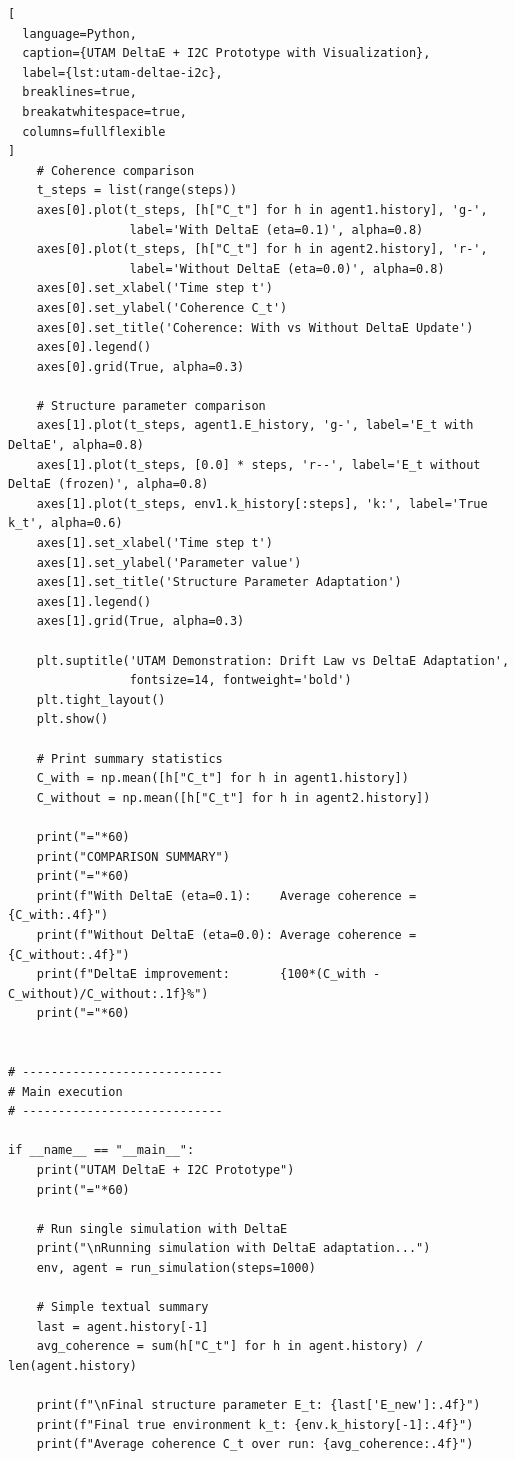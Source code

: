 \documentclass[12pt,a4paper]{report}
\begin{document}
\begin{lstlisting}[
  language=Python,
  caption={UTAM DeltaE + I2C Prototype with Visualization},
  label={lst:utam-deltae-i2c},
  breaklines=true,
  breakatwhitespace=true,
  columns=fullflexible
]
    # Coherence comparison
    t_steps = list(range(steps))
    axes[0].plot(t_steps, [h["C_t"] for h in agent1.history], 'g-', 
                 label='With DeltaE (eta=0.1)', alpha=0.8)
    axes[0].plot(t_steps, [h["C_t"] for h in agent2.history], 'r-', 
                 label='Without DeltaE (eta=0.0)', alpha=0.8)
    axes[0].set_xlabel('Time step t')
    axes[0].set_ylabel('Coherence C_t')
    axes[0].set_title('Coherence: With vs Without DeltaE Update')
    axes[0].legend()
    axes[0].grid(True, alpha=0.3)
    
    # Structure parameter comparison
    axes[1].plot(t_steps, agent1.E_history, 'g-', label='E_t with DeltaE', alpha=0.8)
    axes[1].plot(t_steps, [0.0] * steps, 'r--', label='E_t without DeltaE (frozen)', alpha=0.8)
    axes[1].plot(t_steps, env1.k_history[:steps], 'k:', label='True k_t', alpha=0.6)
    axes[1].set_xlabel('Time step t')
    axes[1].set_ylabel('Parameter value')
    axes[1].set_title('Structure Parameter Adaptation')
    axes[1].legend()
    axes[1].grid(True, alpha=0.3)
    
    plt.suptitle('UTAM Demonstration: Drift Law vs DeltaE Adaptation', 
                 fontsize=14, fontweight='bold')
    plt.tight_layout()
    plt.show()
    
    # Print summary statistics
    C_with = np.mean([h["C_t"] for h in agent1.history])
    C_without = np.mean([h["C_t"] for h in agent2.history])
    
    print("="*60)
    print("COMPARISON SUMMARY")
    print("="*60)
    print(f"With DeltaE (eta=0.1):    Average coherence = {C_with:.4f}")
    print(f"Without DeltaE (eta=0.0): Average coherence = {C_without:.4f}")
    print(f"DeltaE improvement:       {100*(C_with - C_without)/C_without:.1f}%")
    print("="*60)


# ----------------------------
# Main execution
# ----------------------------

if __name__ == "__main__":
    print("UTAM DeltaE + I2C Prototype")
    print("="*60)
    
    # Run single simulation with DeltaE
    print("\nRunning simulation with DeltaE adaptation...")
    env, agent = run_simulation(steps=1000)
    
    # Simple textual summary
    last = agent.history[-1]
    avg_coherence = sum(h["C_t"] for h in agent.history) / len(agent.history)
    
    print(f"\nFinal structure parameter E_t: {last['E_new']:.4f}")
    print(f"Final true environment k_t: {env.k_history[-1]:.4f}")
    print(f"Average coherence C_t over run: {avg_coherence:.4f}")
    

\end{lstlisting}
\end{document}
